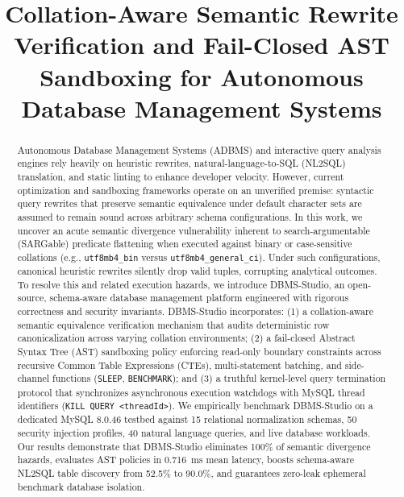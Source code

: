 \documentclass[conference]{IEEEtran}
\begin{document}
\title{Collation-Aware Semantic Rewrite Verification and Fail-Closed AST Sandboxing for Autonomous Database Management Systems}

\author{
}

\maketitle

\begin{abstract}
Autonomous Database Management Systems (ADBMS) and interactive query analysis engines rely heavily on heuristic rewrites, natural-language-to-SQL (NL2SQL) translation, and static linting to enhance developer velocity. However, current optimization and sandboxing frameworks operate on an unverified premise: syntactic query rewrites that preserve semantic equivalence under default character sets are assumed to remain sound across arbitrary schema configurations. In this work, we uncover an acute semantic divergence vulnerability inherent to search-argumentable (SARGable) predicate flattening when executed against binary or case-sensitive collations (e.g., \texttt{utf8mb4\_bin} versus \texttt{utf8mb4\_general\_ci}). Under such configurations, canonical heuristic rewrites silently drop valid tuples, corrupting analytical outcomes. To resolve this and related execution hazards, we introduce DBMS-Studio, an open-source, schema-aware database management platform engineered with rigorous correctness and security invariants. DBMS-Studio incorporates: (1) a collation-aware semantic equivalence verification mechanism that audits deterministic row canonicalization across varying collation environments; (2) a fail-closed Abstract Syntax Tree (AST) sandboxing policy enforcing read-only boundary constraints across recursive Common Table Expressions (CTEs), multi-statement batching, and side-channel functions (\texttt{SLEEP}, \texttt{BENCHMARK}); and (3) a truthful kernel-level query termination protocol that synchronizes asynchronous execution watchdogs with MySQL thread identifiers (\texttt{KILL QUERY <threadId>}). We empirically benchmark DBMS-Studio on a dedicated MySQL 8.0.46 testbed against 15 relational normalization schemas, 50 security injection profiles, 40 natural language queries, and live database workloads. Our results demonstrate that DBMS-Studio eliminates 100\% of semantic divergence hazards, evaluates AST policies in 0.716~ms mean latency, boosts schema-aware NL2SQL table discovery from 52.5\% to 90.0\%, and guarantees zero-leak ephemeral benchmark database isolation.
\end{abstract}
\end{document}

